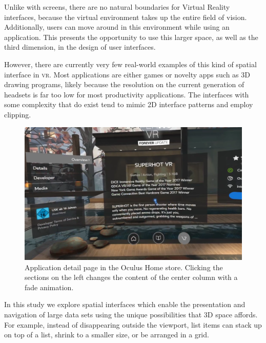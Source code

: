 \documentclass{tufte-book} %
\begin{document}
Unlike with screens, there are no natural boundaries for Virtual Reality interfaces, because the virtual environment takes up the entire field of vision. Additionally, users can move around in this environment while using an application. This presents the opportunity to use this larger space, as well as the third dimension, in the design of user interfaces.

However, there are currently very few real-world examples of this kind of spatial interface in \textsc{vr}. Most applications are either games or novelty apps such as 3D drawing programs, likely because the resolution on the current generation of headsets is far too low for most productivity applications.
The interfaces with some complexity that do exist tend to mimic 2D interface patterns and employ clipping.

\begin{figure}
  \includegraphics{superhot.png}
  \caption{Application detail page in the Oculus Home store. Clicking the sections on the left changes the content of the center column with a fade animation.}
  \label{fig:superhot}
\end{figure}


In this study we explore spatial interfaces which enable the presentation and navigation of large data sets using the unique possibilities that 3D space affords. For example, instead of disappearing outside the viewport, list items can stack up on top of a list, shrink to a smaller size, or be arranged in a grid.
\end{document}
